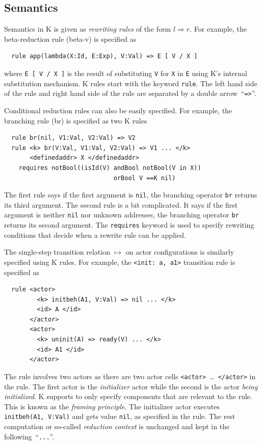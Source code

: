 \documentclass{llncs}
\begin{document}
\subsection{Semantics}\label{sec:semantics}
Semantics in K is given as \emph{rewriting rules} of the form $l \Rightarrow r$.
For example, the  beta-reduction rule (beta-v) is specified as
\begin{verbatim}
  rule app(lambda(X:Id, E:Exp), V:Val) => E [ V / X ]
\end{verbatim}
where \texttt{E [ V / X ]} is the result of substituting \texttt{V} for 
\texttt{X} in \texttt{E} using K's internal substitution mechanism.
K rules start with the keyword \texttt{rule}. The left hand side of the rule 
and right hand side of the rule are separated by a double arrow~``\texttt{=>}''.

Conditional reduction rules can also be easily specified.
For example, the branching rule (br) is specified as two K rules
\begin{verbatim}
  rule br(nil, V1:Val, V2:Val) => V2
  rule <k> br(V:Val, V1:Val, V2:Val) => V1 ... </k>
       <definedaddr> X </definedaddr>
    requires notBool((isId(V) andBool notBool(V in X))
                              orBool V ==K nil)
\end{verbatim}
The first rule says if the first argument is \texttt{nil}, the branching 
operator \texttt{br} returns its third argument.
The second rule is a bit complicated.
It says if the first argument is neither \texttt{nil} nor 
unknown addresses, the branching operator \texttt{br} returns its second 
argument.
The \texttt{requires} keyword is used to specify rewriting conditions that 
decide when a rewrite rule can be applied.

The single-step transition relation $\mapsto$ on actor configurations is 
similarly specified using K rules.
For example, the \texttt{<init: a, a1>} transition rule is specified as
\small
\begin{verbatim}
  rule <actor>
         <k> initbeh(A1, V:Val) => nil ... </k>
         <id> A </id>
       </actor>
       <actor>
         <k> uninit(A) => ready(V) ... </k>
         <id> A1 </id>
       </actor>
\end{verbatim}
\normalsize
The rule involves two actors as there are two actor cells 
\texttt{<actor>}\ \dots\ \texttt{</actor>} in the rule.
The first actor is the \emph{initializer} actor while the second is the actor 
\emph{being initialized}.
K supports to only specify components that are relevant to the rule. This is 
known as the \emph{framing principle}.
The initializer actor executes \texttt{initbeh(A1, V:Val)} and gets value 
\texttt{nil}, as specified in the rule.
The rest computation or so-called \emph{reduction context} is unchanged and 
kept in 
the following~``\texttt{...}''.
\end{document}
